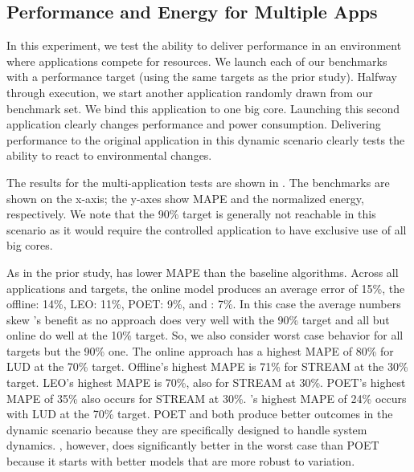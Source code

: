 



\subsection{Performance and Energy for Multiple Apps}
In this experiment, we test the ability to deliver performance in an
environment where applications compete for resources.  We launch each
of our benchmarks with a performance target (using the same targets as
the prior study).  Halfway through execution, we start another
application randomly drawn from our benchmark set.  We bind this
application to one big core.  Launching this second application
clearly changes performance and power consumption.  Delivering
performance to the original application in this dynamic scenario
clearly tests the ability to react to environmental changes.

The results for the multi-application tests are shown in
.  The benchmarks are shown on the
x-axis; the y-axes show MAPE and the normalized energy, respectively.
We note that the 90\% target is generally not reachable in this
scenario as it would require the controlled application to have
exclusive use of all big cores.


As in the prior study, \SYSTEM{} has lower MAPE than the baseline
algorithms. Across all applications and targets, the online model
produces an average error of 15\%, the offline: 14\%, LEO: 11\%, POET:
9\%, and \SYSTEM{}: 7\%.  In this case the average numbers skew
\SYSTEM{}'s benefit as no approach does very well with the 90\% target
and all but online do well at the 10\% target.  So, we also consider
worst case behavior for all targets but the 90\% one.  The online
approach has a highest MAPE of 80\% for LUD at the 70\% target.
Offline's highest MAPE is 71\% for STREAM at the 30\% target.  LEO's
highest MAPE is 70\%, also for STREAM at 30\%. POET's highest MAPE of
35\% also occurs for STREAM at 30\%.  \SYSTEM{}'s highest MAPE of 24\%
occurs with LUD at the 70\% target.  POET and \SYSTEM{} both produce
better outcomes in the dynamic scenario because they are specifically
designed to handle system dynamics.  \SYSTEM{}, however, does
significantly better in the worst case than POET because it starts
with better models that are more robust to variation.


